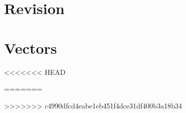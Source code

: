 \documentclass[book,12pt,oneside,openany]{memoir}
\begin{document}


\newpage

\section{Revision}


\newpage



\newpage



\section{Vectors}




\newpage



<<<<<<< HEAD

=======
\newpage



\newpage


>>>>>>> c4990dfcd4eabe1eb451f4dce31df400b3a18b34
\end{document}
